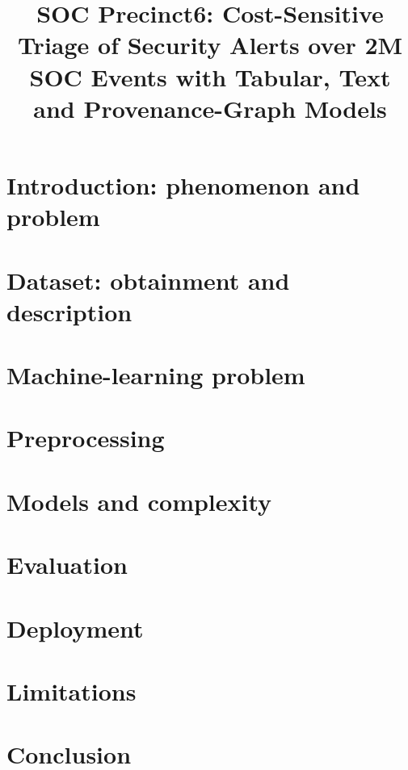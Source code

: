 \documentclass[conference]{IEEEtran}
\begin{document}
\title{SOC Precinct6: Cost-Sensitive Triage of Security Alerts over 2M SOC Events with Tabular, Text and Provenance-Graph Models}

\author{
}

\maketitle

\section{Introduction: phenomenon and problem}
\label{sec:intro}

\section{Dataset: obtainment and description}
\label{sec:data}

\section{Machine-learning problem}
\label{sec:mlproblem}

\section{Preprocessing}
\label{sec:prepro}

\section{Models and complexity}
\label{sec:models}

\section{Evaluation}
\label{sec:eval}

\section{Deployment}
\label{sec:deploy}

\section{Limitations}

\section{Conclusion}
\end{document}
